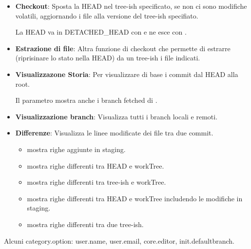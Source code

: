 \begin{itemize}

	\item \textbf{Checkout}: Sposta la HEAD nel tree-ish specificato, se non ci sono modifiche volatili, aggiornando i file alla versione del tree-ish specifiato.


	La HEAD va in DETACHED\_HEAD con  e ne esce con .

	\item \textbf{Estrazione di file}: Altra funzione di checkout che permette di estrarre (riprisinare lo stato nella HEAD) da un tree-ish i file indicati.


	\item \textbf{Visualizzazone Storia}: Per visualizzare di base i commit dal HEAD alla root.


	Il parametro  mostra anche i branch fetched di .

	\item \textbf{Visualizzazione branch}: Visualizza tutti i branch locali e remoti.


	\item \textbf{Differenze}: Visualizza le linee modificate dei file tra due commit.
	\begin{itemize}
		\item {} mostra righe aggiunte in staging.
		\item {} mostra righe differenti tra HEAD e workTree.
		\item {} mostra righe differenti tra tree-ish e workTree.
		\item {} mostra righe differenti tra HEAD e workTree includendo le modifiche in staging.
		\item {} mostra righe differenti tra due tree-ish.
	\end{itemize}
\end{itemize}

Alcuni category.option: user.name, user.email, core.editor, init.defaultbranch.

